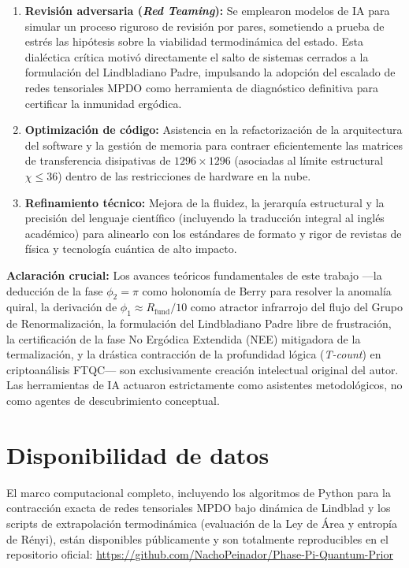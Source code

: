 \documentclass[12pt,a4paper]{article}
\theoremstyle{plain}
\theoremstyle{definition}
\theoremstyle{remark}
\begin{document}
\begin{enumerate}
    \item \textbf{Revisión adversaria (\textit{Red Teaming}):} Se emplearon modelos de IA para simular un proceso riguroso de revisión por pares, sometiendo a prueba de estrés las hipótesis sobre la viabilidad termodinámica del estado. Esta dialéctica crítica motivó directamente el salto de sistemas cerrados a la formulación del Lindbladiano Padre, impulsando la adopción del escalado de redes tensoriales MPDO como herramienta de diagnóstico definitiva para certificar la inmunidad ergódica.
    \item \textbf{Optimización de código:} Asistencia en la refactorización de la arquitectura del software y la gestión de memoria para contraer eficientemente las matrices de transferencia disipativas de $1296 \times 1296$ (asociadas al límite estructural $\chi \le 36$) dentro de las restricciones de hardware en la nube.
    \item \textbf{Refinamiento técnico:} Mejora de la fluidez, la jerarquía estructural y la precisión del lenguaje científico (incluyendo la traducción integral al inglés académico) para alinearlo con los estándares de formato y rigor de revistas de física y tecnología cuántica de alto impacto.
\end{enumerate}

\textbf{Aclaración crucial:} Los avances teóricos fundamentales de este trabajo —la deducción de la fase $\phi_2 = \pi$ como holonomía de Berry para resolver la anomalía quiral, la derivación de $\phi_1 \approx R_{\text{fund}}/10$ como atractor infrarrojo del flujo del Grupo de Renormalización, la formulación del Lindbladiano Padre libre de frustración, la certificación de la fase No Ergódica Extendida (NEE) mitigadora de la termalización, y la drástica contracción de la profundidad lógica (\textit{T-count}) en criptoanálisis FTQC— son exclusivamente creación intelectual original del autor. Las herramientas de IA actuaron estrictamente como asistentes metodológicos, no como agentes de descubrimiento conceptual.


\section{Disponibilidad de datos}
El marco computacional completo, incluyendo los algoritmos de Python para la contracción exacta de redes tensoriales MPDO bajo dinámica de Lindblad y los scripts de extrapolación termodinámica (evaluación de la Ley de Área y entropía de Rényi), están disponibles públicamente y son totalmente reproducibles en el repositorio oficial: \url{https://github.com/NachoPeinador/Phase-Pi-Quantum-Prior}
\end{document}
